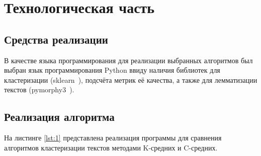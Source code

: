 \chapter{Технологическая часть}

\section{Средства реализации}

В качестве языка программирования для реализации выбранных алгоритмов был выбран язык программирования Python \cite{pythonlang} ввиду наличия библиотек для кластеризации (sklearn~\cite{sklearn}), подсчёта метрик её качества, а также для лемматизации текстов (pymorphy3~\cite{morph}).

\section{Реализация алгоритма}

На листинге \ref{lst:1} представлена реализация программы для сравнения алгоритмов кластеризации текстов методами K-средних и C-средних.

